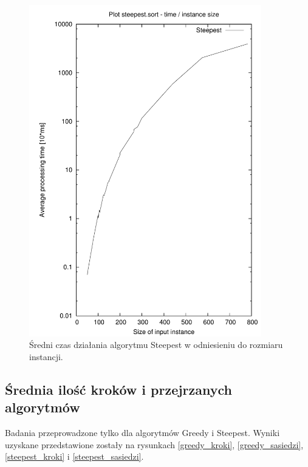 \begin{figure}
\begin{center}
\includegraphics[width=0.9\textwidth]{wykresy/steepest_time}
\end{center}
\caption{Średni czas działania algorytmu Steepest w odniesieniu do rozmiaru instancji.}
\label{steepest_time}
\end{figure}

\subsection{Średnia ilość kroków i przejrzanych algorytmów}

Badania przeprowadzone tylko dla algorytmów Greedy i Steepest. Wyniki uzyskane przedstawione 
zostały na rysunkach \ref{greedy_kroki}, \ref{greedy_sasiedzi}, \ref{steepest_kroki} i \ref{steepest_sasiedzi}. 

